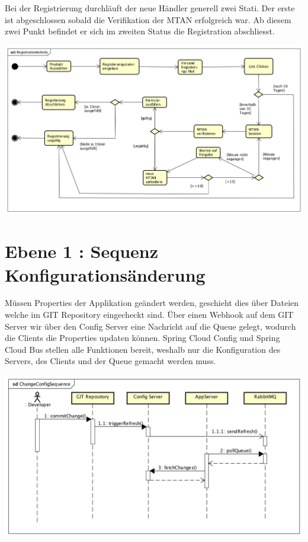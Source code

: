  Bei der Registrierung durchläuft der neue Händler generell zwei Stati. Der erste ist abgeschlossen sobald die Verifikation der MTAN erfolgreich war. Ab diesem zwei Punkt befindet er sich im zweiten Status die Registration abschliesst. 

\begin{center}
	\includegraphics[scale=0.44]{RegistrationActivity.png}
\end{center}
\newpage

\section{Ebene 1 : Sequenz Konfigurationsänderung}

Müssen Properties der Applikation geändert werden, geschieht dies über Dateien  welche im GIT Repository eingecheckt sind. Über einen Webhook auf dem GIT Server wir über den Config Server eine Nachricht auf die Queue gelegt, wodurch die Clients die Properties updaten können. Spring Cloud Config und Spring Cloud Bus stellen alle Funktionen bereit, weshalb nur die Konfiguration des Servers, des Clients und der Queue gemacht werden muss.
\begin{center}
	\includegraphics[scale=0.6]{ChangeConfigSequence.png}
\end{center}
\newpage

